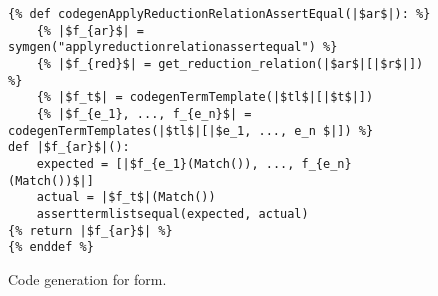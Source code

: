 \begin{figure}[ht]
\begin{verbatim}
{% def codegenApplyReductionRelationAssertEqual(|$ar$|): %}
	{% |$f_{ar}$| = symgen("applyreductionrelationassertequal") %}
	{% |$f_{red}$| = get_reduction_relation(|$ar$|[|$r$|]) %}
	{% |$f_t$| = codegenTermTemplate(|$tl$|[|$t$|])
	{% |$f_{e_1}, ..., f_{e_n}$| = codegenTermTemplates(|$tl$|[|$e_1, ..., e_n $|]) %}
def |$f_{ar}$|():
	expected = [|$f_{e_1}(Match()), ..., f_{e_n}(Match())$|]
	actual = |$f_t$|(Match())
	asserttermlistsequal(expected, actual)
{% return |$f_{ar}$| %}
{% enddef %}
\end{verbatim} 
\caption{Code generation for \ApplyReductionRelationAssertEqualNoArgs \space form.}
\label{codegen-applyred}
\end{figure}


